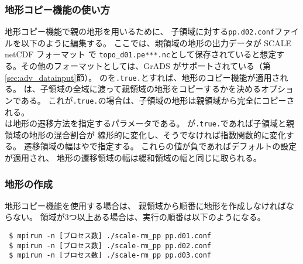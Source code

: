 \subsubsection{地形コピー機能の使い方}

地形コピー機能で親の地形を用いるために、
子領域に対する\verb|pp.d02.conf|ファイルを以下のように編集する。
ここでは、親領域の地形の出力データが SCALE netCDF フォーマット で \verb|topo_d01.pe***.nc|として保存されていると想定する。その他のフォーマットとしては、GrADS がサポートされている（第\ref{sec:adv_datainput}節）。
のを\verb|.true.|とすれば、地形のコピー機能が適用される。
は、子領域の全域に渡って親領域の地形をコピーするかを決めるオプションである。
これが\verb|.true.|の場合は、子領域の地形は親領域から完全にコピーされる。\\
は地形の遷移方法を指定するパラメータである。
が\verb|.true.|であれば子領域と親領域の地形の混合割合が
線形的に変化し、そうでなければ指数関数的に変化する。
遷移領域の幅はやで指定する。
これらの値が負であればデフォルトの設定が適用され、
地形の遷移領域の幅は緩和領域の幅と同じに取られる。


\subsubsection{地形の作成}

地形コピー機能を使用する場合は、
親領域から順番に地形を作成しなければならない。
領域が3つ以上ある場合は、実行の順番は以下のようになる。

\begin{verbatim}
 $ mpirun -n [プロセス数] ./scale-rm_pp pp.d01.conf
 $ mpirun -n [プロセス数] ./scale-rm_pp pp.d02.conf
 $ mpirun -n [プロセス数] ./scale-rm_pp pp.d03.conf
\end{verbatim}
